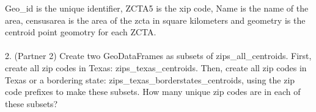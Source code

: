 \documentclass[
  letterpaper,
  DIV=11,
  numbers=noendperiod]{scrartcl}
\makeatletter
\let\oldparagraph\paragraph
\renewcommand{\paragraph}{
    \@ifstar
      \xxxParagraphStar
      \xxxParagraphNoStar
  }
\newcommand{\xxxParagraphStar}[1]{\oldparagraph*{#1}\mbox{}}
\newcommand{\xxxParagraphNoStar}[1]{\oldparagraph{#1}\mbox{}}
\makeatother
\begin{document}
Geo\_id is the unique identifier, ZCTA5 is the xip code, Name is the
name of the area, censusarea is the area of the zcta in square
kilometers and geometry is the centroid point geomotry for each ZCTA.

\paragraph{2. (Partner 2) Create two GeoDataFrames as subsets of
zips\_all\_centroids. First, create all zip codes in Texas:
zips\_texas\_centroids. Then, create all zip codes in Texas or a
bordering state: zips\_texas\_borderstates\_centroids, using the zip
code prefixes to make these subsets. How many unique zip codes are in
each of these
subsets?}\label{partner-2-create-two-geodataframes-as-subsets-of-zips_all_centroids.-first-create-all-zip-codes-in-texas-zips_texas_centroids.-then-create-all-zip-codes-in-texas-or-a-bordering-state-zips_texas_borderstates_centroids-using-the-zip-code-prefixes-to-make-these-subsets.-how-many-unique-zip-codes-are-in-each-of-these-subsets}
\end{document}
